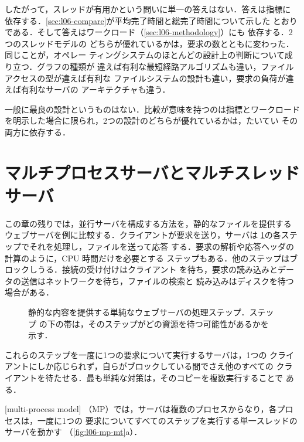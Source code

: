\documentclass[../main.tex]{subfiles}
\begin{document}
したがって，スレッドが有用かという問いに単一の答えはない．答えは指標に
依存する．\cref{sec:l06-compare}が平均完了時間と総完了時間について示した
とおりである．そして答えはワークロード（\cref{sec:l06-methodology}）にも
依存する．2つのスレッドモデルの
どちらが優れているかは，要求の数とともに変わった．同じことが，オペレー
ティングシステムのほとんどの設計上の判断について成り立つ．グラフの種類が
違えば有利な最短経路アルゴリズムも違い，ファイルアクセスの型が違えば有利な
ファイルシステムの設計も違い，要求の負荷が違えば有利なサーバの
アーキテクチャも違う．

\begin{keypoint}
  一般に最良の設計というものはない．比較が意味を持つのは指標とワークロード
  を明示した場合に限られ，2つの設計のどちらが優れているかは，たいてい
  その両方に依存する．
\end{keypoint}

\section{マルチプロセスサーバとマルチスレッドサーバ}
\label{sec:l06-mp-mt}

この章の残りでは，並行サーバを構成する方法を，静的なファイルを提供する
ウェブサーバを例に比較する．クライアントが要求を送り，サーバは
\cref{fig:l06-web-steps}の各ステップでそれを処理し，ファイルを送って応答
する．要求の解析や応答ヘッダの計算のように，CPU 時間だけを必要とする
ステップもある．他のステップはブロックしうる．接続の受け付けはクライアント
を待ち，要求の読み込みとデータの送信はネットワークを待ち，ファイルの検索と
読み込みはディスクを待つ場合がある．

\begin{figure}[htbp]
  \centering
  
  \caption{静的な内容を提供する単純なウェブサーバの処理ステップ．ステップ
    の下の帯は，そのステップがどの資源を待つ可能性があるかを示す．}
  \label{fig:l06-web-steps}
\end{figure}

これらのステップを一度に1つの要求について実行するサーバは，1つの
クライアントにしか応じられず，自らがブロックしている間でさえ他のすべての
クライアントを待たせる．最も単純な対策は，そのコピーを複数実行することで
ある．

\begin{definition}[マルチプロセスモデル]
  [multi-process model]%
  （MP）では，サーバは複数のプロセスからなり，各プロセスは，一度に1つの
  要求についてすべてのステップを実行する単一スレッドのサーバを動かす
  （\cref{fig:l06-mp-mt}a）．
\end{definition}
\end{document}
